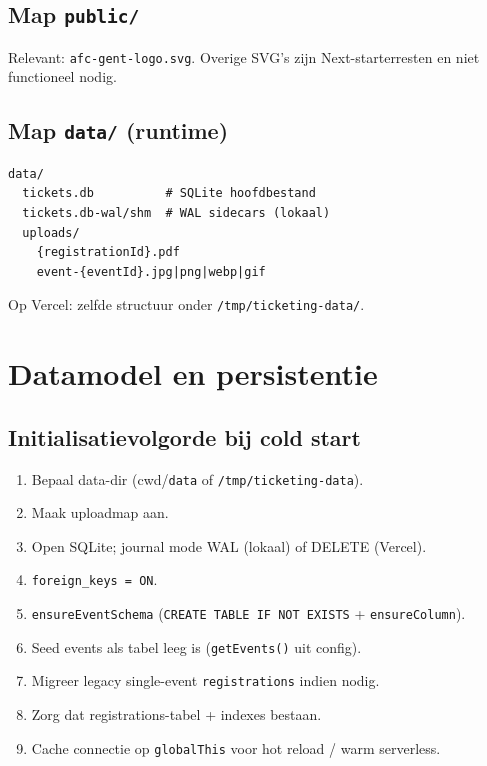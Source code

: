 \documentclass[11pt,a4paper]{report}
\begin{document}
\section{Map \texttt{public/}}
Relevant: \texttt{afc-gent-logo.svg}. Overige SVG's zijn Next-starterresten en niet functioneel nodig.

\section{Map \texttt{data/} (runtime)}
\begin{lstlisting}
data/
  tickets.db          # SQLite hoofdbestand
  tickets.db-wal/shm  # WAL sidecars (lokaal)
  uploads/
    {registrationId}.pdf
    event-{eventId}.jpg|png|webp|gif
\end{lstlisting}
Op Vercel: zelfde structuur onder \texttt{/tmp/ticketing-data/}.

\chapter{Datamodel en persistentie}
\label{ch:data}

\section{Initialisatievolgorde bij cold start}
\begin{enumerate}[leftmargin=*]
  \item Bepaal data-dir (cwd/\texttt{data} of \texttt{/tmp/ticketing-data}).
  \item Maak uploadmap aan.
  \item Open SQLite; journal mode WAL (lokaal) of DELETE (Vercel).
  \item \texttt{foreign\_keys = ON}.
  \item \texttt{ensureEventSchema} (\texttt{CREATE TABLE IF NOT EXISTS} + \texttt{ensureColumn}).
  \item Seed events als tabel leeg is (\texttt{getEvents()} uit config).
  \item Migreer legacy single-event \texttt{registrations} indien nodig.
  \item Zorg dat registrations-tabel + indexes bestaan.
  \item Cache connectie op \texttt{globalThis} voor hot reload / warm serverless.
\end{enumerate}
\end{document}
